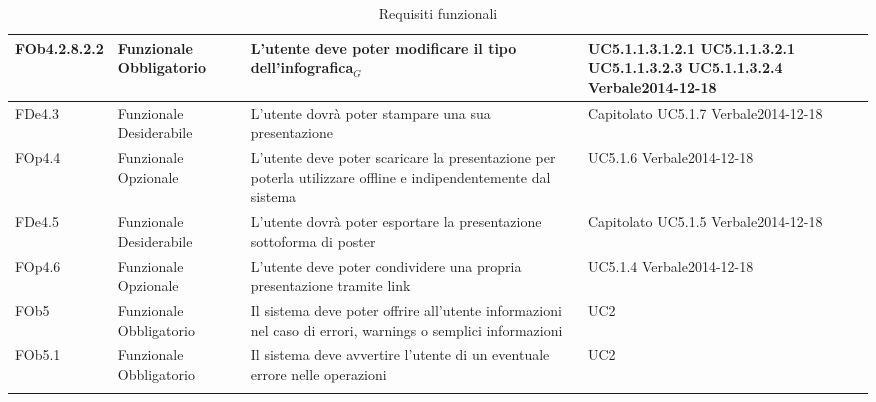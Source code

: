 \begin{longtable}{|l|p{2.5cm}|p{5cm}|p{3.5cm}|}
\hline
FOb4.2.8.2.2 & Funzionale \linebreak Obbligatorio & L'utente deve poter modificare il tipo dell'infografica$_G$ & UC5.1.1.3.1.2.1 \linebreak  UC5.1.1.3.2.1 \linebreak  UC5.1.1.3.2.3 \linebreak  UC5.1.1.3.2.4 \linebreak  Verbale2014-12-18 \linebreak  \\
\hline
FDe4.3 & Funzionale \linebreak Desiderabile & L'utente dovrà poter stampare una sua presentazione & Capitolato \linebreak  UC5.1.7 \linebreak  Verbale2014-12-18 \linebreak  \\
\hline
FOp4.4 & Funzionale \linebreak Opzionale & L'utente deve poter scaricare la presentazione per poterla utilizzare offline e indipendentemente dal sistema & UC5.1.6 \linebreak  Verbale2014-12-18 \linebreak  \\
\hline
FDe4.5 & Funzionale \linebreak Desiderabile & L'utente dovrà poter esportare la presentazione sottoforma di poster & Capitolato \linebreak  UC5.1.5 \linebreak  Verbale2014-12-18 \linebreak  \\
\hline
FOp4.6 & Funzionale \linebreak Opzionale & L'utente deve poter condividere una propria presentazione tramite link & UC5.1.4 \linebreak  Verbale2014-12-18 \linebreak  \\
\hline
FOb5 & Funzionale \linebreak Obbligatorio & Il sistema deve poter offrire all'utente informazioni nel caso di errori, warnings o semplici informazioni & UC2 \linebreak \\
\hline
FOb5.1 & Funzionale \linebreak Obbligatorio & Il sistema deve avvertire l'utente di un eventuale errore nelle operazioni & UC2 \linebreak  \\
\hline
\caption{Requisiti funzionali}
\end{longtable}
